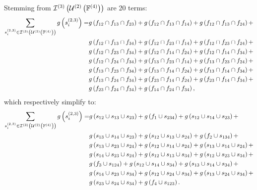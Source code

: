 \documentclass[11pt]{article}
\newcommand{\gxn}[1]{g\left(#1\right)}
\newcommand{\fn}[1]{f^{(#1)}}
\newcommand{\ints}[2]{\mathcal{I}^{(#1)}\left(#2\right)}
\newcommand{\smem}[2]{s^{\left(#1\right)}_{#2}}
\newcommand{\gapprox}[1]{g\left(#1\right)}
\begin{document}
Stemming from $\intsset{3}{2}{4}$ are 20 terms:
\begin{align}
	\sum_{\smem{2,3}{i}\in\intsset{3}{2}{4}}\gxn{\smem{2,3}{i}} =
	  & \gxn{\IDiDjDk} + \gxn{\IDiDjDl} + \gxn{\IDiDjDm} + \nonumber\\
	  & \gxn{\IDiDjDn} + \gxn{\IDiDkDl} + \gxn{\IDiDkDm} + \nonumber\\
	  & \gxn{\IDiDkDn} + \gxn{\IDiDlDm} + \gxn{\IDiDlDn} + \nonumber\\
	  & \gxn{\IDiDmDn} + \gxn{\IDjDkDl} + \gxn{\IDjDkDm} + \nonumber\\
	  & \gxn{\IDjDkDn} + \gxn{\IDjDlDm} + \gxn{\IDjDlDn} + \nonumber\\
	  & \gxn{\IDjDmDn} + \gxn{\IDkDlDm} + \gxn{\IDkDlDn} + \nonumber\\
	  & \gxn{\IDkDmDn} + \gxn{\IDlDmDn},
\end{align}
which respectively simplify to:
\begin{align}
	\sum_{\smem{2,3}{i}\in\intsset{3}{2}{4}}\gxn{\smem{2,3}{i}} =
	& \gxn{\Ii\cup\Ij\cup\Ik} + \gxn{f_1\cup\Ill} +
	  \gxn{\Ii\cup\Il\cup\Ik} + \nonumber\\
	& \gxn{\Ij\cup\Il\cup\Ik} + \gxn{\Ii\cup\Ij\cup\In} +
	  \gxn{f_2\cup\Ikk} + \nonumber\\
	& \gxn{\Ij\cup\Ik\cup\In} + \gxn{\Ii\cup\Il\cup\In} +
	  \gxn{\Ij\cup\Il\cup\In} + \nonumber\\
	& \gxn{\Il\cup\Ik\cup\In} + \gxn{\Ii\cup\Ij\cup\Io} +
	  \gxn{\Ii\cup\Ik\cup\Io} + \nonumber\\
	& \gxn{f_3\cup\Ijj} + \gxn{\Ii\cup\Il\cup\Io} +
	  \gxn{\Ij\cup\Il\cup\Io} + \nonumber\\
	& \gxn{\Il\cup\Ik\cup\Io} + \gxn{\Ii\cup\In\cup\Io} +
	  \gxn{\Ij\cup\In\cup\Io} +\nonumber\\
	& \gxn{\Ik\cup\In\cup\Io} + \gxn{f_4\cup\Iii}.
\end{align}
\end{document}
